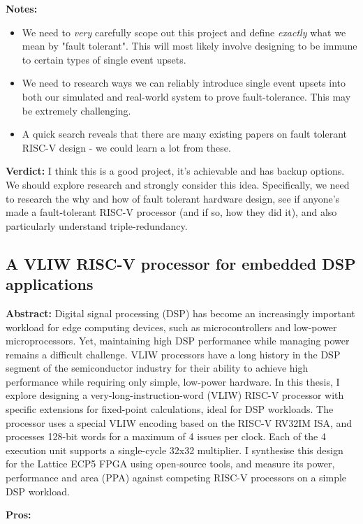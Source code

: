 \documentclass[12pt]{article}
\begin{document}
\textbf{Notes:}

\begin{itemize}
    \item We need to \textit{very} carefully scope out this project and define \textit{exactly} what we mean
	by "fault tolerant". This will most likely involve designing to be immune to certain types of single
	event upsets.
    \item We need to research ways we can reliably introduce single event upsets into both our simulated and
	real-world system to prove fault-tolerance. This may be extremely challenging.
    \item A quick search reveals that there are many existing papers on fault tolerant RISC-V design - we
	could learn a lot from these.
\end{itemize}

\textbf{Verdict:} I think this is a good project, it's achievable and has backup options. We should explore 
research and strongly consider this idea. Specifically, we need to research the why and how of fault tolerant
hardware design, see if anyone's made a fault-tolerant RISC-V processor (and if so, how they did it), and also
particularly understand triple-redundancy.

\subsection{A VLIW RISC-V processor for embedded DSP applications}
\textbf{Abstract:} Digital signal processing (DSP) has become an increasingly important workload for
edge computing devices, such as microcontrollers and low-power microprocessors. Yet, maintaining
high DSP performance while managing power remains a difficult challenge. VLIW processors have a long
history in the DSP segment of the semiconductor industry for their ability to achieve high
performance while requiring only simple, low-power hardware. In this thesis, I explore designing a
very-long-instruction-word (VLIW) RISC-V processor with specific extensions for fixed-point
calculations, ideal for DSP workloads. The processor uses a special VLIW encoding based on the
RISC-V RV32IM ISA, and processes 128-bit words for a maximum of 4 issues per clock. Each of the 4
execution unit supports a single-cycle 32x32 multiplier. I synthesise this design for the Lattice
ECP5 FPGA using open-source tools, and measure its power, performance and area (PPA) against
competing RISC-V processors on a simple DSP workload.

\textbf{Pros:}
\end{document}
